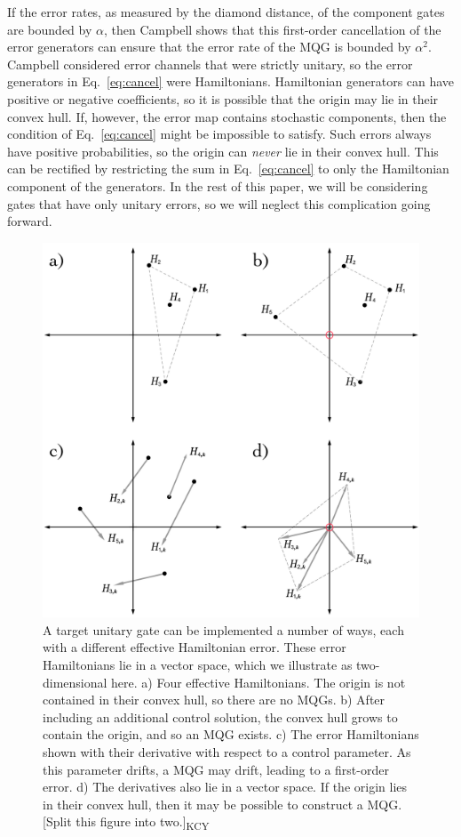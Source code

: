 \documentclass[aps,nofootinbib,pra,notitlepage,twocolumn]{revtex4-1}
\newcommand{\kcy}[1]{{\color{red}[#1]\textsubscript{\rm{KCY}}}}
\begin{document}
If the error rates, as measured by the diamond distance, of the component gates are bounded by $\alpha$, then Campbell shows that this first-order cancellation of the error generators can ensure that the error rate of the MQG is bounded by $\alpha^2$. Campbell considered error channels that were strictly unitary, so the error generators in Eq.~\eqref{eq:cancel} were Hamiltonians. Hamiltonian generators can have positive or negative coefficients, so it is possible that the origin may lie in their convex hull. If, however, the error map contains stochastic components, then the condition of Eq.~\eqref{eq:cancel} might be impossible to satisfy. Such errors always have positive probabilities, so the origin can \emph{never} lie in their convex hull. This can be rectified by restricting the sum in Eq.~\eqref{eq:cancel} to only the Hamiltonian component of the generators. In the rest of this paper, we will be considering gates that have only unitary errors, so we will neglect this complication going forward. 

\begin{figure}
  \centering
  \includegraphics[width=\columnwidth]{vectorspace.pdf}
  \caption{A target unitary gate can be implemented a number of ways, each with a different effective Hamiltonian error. These error Hamiltonians lie in a vector space, which we illustrate as two-dimensional here. a) Four effective Hamiltonians. The origin is not contained in their convex hull, so there are no MQGs. b) After including an additional control solution, the convex hull grows to contain the origin, and so an MQG exists. c) The error Hamiltonians shown with their derivative with respect to a control parameter. As this parameter drifts, a MQG may drift, leading to a first-order error. d) The derivatives also lie in a vector space. If the origin lies in their convex hull, then it may be possible to construct a MQG. \kcy{Split this figure into two.}}
  \label{fig:vectorspace}
\end{figure}
\end{document}
